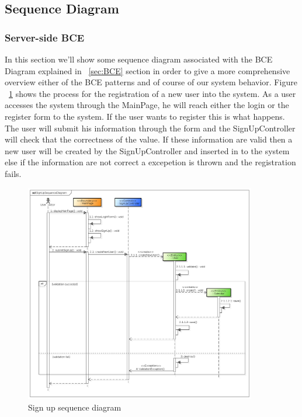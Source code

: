\subsection{Sequence Diagram}
\subsubsection{Server-side BCE}
In this section we'll show some sequence diagram associated with the BCE Diagram explained in ~\ref{sec:BCE} section in order to give  a more comprehensive overview either of the BCE patterns and of course of our system behavior.
Figure ~\ref{fig:signupSeq} shows the process for the registration of a new user into the system. As a user accesses the system through the MainPage, he will reach either the login or the register form to the system. If the user wants to register this is what happens.
The user will submit his information through the form and the SignUpController will check that the correctness of the value. If these information are valid then a new user will be created by the SignUpController and inserted in to the system else if the information are not correct a excepetion is thrown and the registration fails. 
\begin{center}
 \begin{figure}[H]
    \includegraphics[width=0.9\textwidth]{./BCEDiagram/BCE/EntityOverview/SignUpSequenceDiagram.png}
    \caption{Sign up sequence diagram}
     \label{fig:signupSeq}
     \end{figure}
   \end{center}  
  
